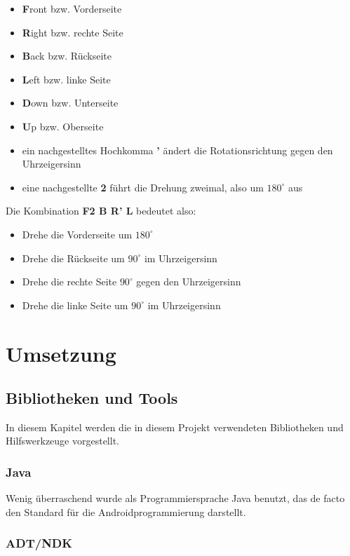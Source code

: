 \begin{itemize}
  \item \textbf{F}ront bzw. Vorderseite
  \item \textbf{R}ight bzw. rechte Seite
  \item \textbf{B}ack bzw. Rückseite
  \item \textbf{L}eft bzw. linke Seite
  \item \textbf{D}own bzw. Unterseite
  \item \textbf{U}p bzw. Oberseite
  \item ein nachgestelltes Hochkomma \textbf{'} ändert die Rotationsrichtung gegen den
    Uhrzeigersinn
  \item eine nachgestellte \textbf{2} führt die Drehung zweimal, also um
    $180^\circ$ aus
\end{itemize}

Die Kombination \textbf{F2 B R' L} bedeutet also:
\begin{itemize}
  \item Drehe die Vorderseite um $180^\circ$
  \item Drehe die Rückseite um $90^\circ$ im Uhrzeigersinn
  \item Drehe die rechte Seite $90^\circ$ gegen den Uhrzeigersinn
  \item Drehe die linke Seite um $90^\circ$ im Uhrzeigersinn
\end{itemize}


\section{Umsetzung}  %

\subsection{Bibliotheken und Tools}  %
In diesem Kapitel werden die in diesem Projekt verwendeten Bibliotheken und
Hilfswerkzeuge vorgestellt.

\subsubsection{Java}  %

Wenig überraschend wurde als Programmiersprache Java benutzt, das de facto den
Standard für die Androidprogrammierung darstellt.

\subsubsection{ADT/NDK}  %

